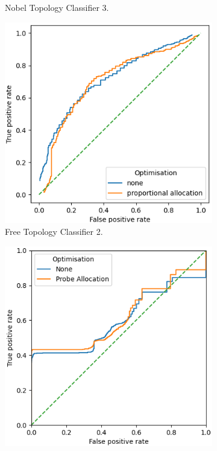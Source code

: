 \begin{figure}[H]
\begin{subfigure}[H]{0.475\textwidth}
        \caption{Nobel Topology Classifier 3.}
    \end{subfigure}
    \begin{subfigure}[H]{0.475\textwidth}
        \includegraphics[width=\textwidth]{figs/results/france_ac2_opt.png}
        \caption{Free Topology Classifier 2.}
    \end{subfigure}
    \begin{subfigure}[H]{0.475\textwidth}
        \includegraphics[width=\textwidth]{figs/results/france_ac3_opt.png}

\end{subfigure}
\end{figure}
